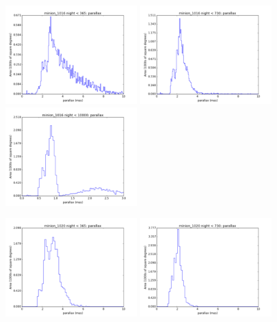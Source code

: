 \begin{figure}[ht]
  \begin{center}
  \includegraphics[width=2.0in]{./figs/milkyway/astromPanels/MW_Astrom_paError_Baseline_01y_hst.png}
  \includegraphics[width=2.0in]{./figs/milkyway/astromPanels/MW_Astrom_paError_Baseline_02y_hst.png}
  \includegraphics[width=2.0in]{./figs/milkyway/astromPanels/MW_Astrom_paError_Baseline_10y_hst.png}
  \end{center}
  \begin{center}
  \includegraphics[width=2.0in]{./figs/milkyway/astromPanels/MW_Astrom_paError_PanSTARRS_01y_hst.png}
  \includegraphics[width=2.0in]{./figs/milkyway/astromPanels/MW_Astrom_paError_PanSTARRS_02y_hst.png}

\end{center}
\end{figure}
